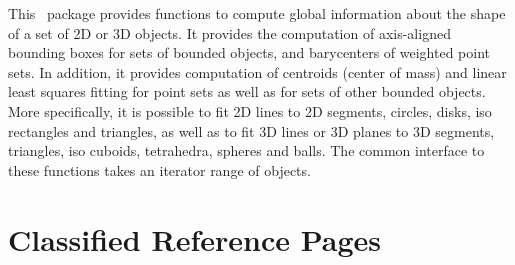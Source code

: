 


This \cgal\ package provides functions to compute global information
about the shape of a set of 2D or 3D objects. It provides the
computation of axis-aligned bounding boxes for sets of bounded
objects, and barycenters of weighted point sets. In addition, it
provides computation of centroids (center of mass) and linear least
squares fitting for point sets as well as for sets of other bounded
objects. More specifically, it is possible to fit 2D lines to 2D
segments, circles, disks, iso rectangles and triangles, as well as to
fit 3D lines or 3D planes to 3D segments, triangles, iso cuboids,
tetrahedra, spheres and balls. The common interface to these functions
takes an iterator range of objects.

\section{Classified Reference Pages}


\\
\\
\\
\\
\\

